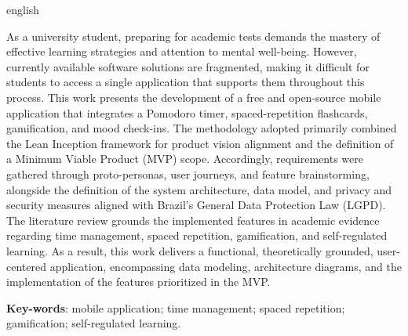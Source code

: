 \begin{resumo}[Abstract]
 \begin{otherlanguage*}{english}

As a university student, preparing for academic tests demands the mastery of effective learning strategies and attention to mental well-being. However, currently available software solutions are fragmented, making it difficult for students to access a single application that supports them throughout this process. This work presents the development of a free and open-source mobile application that integrates a Pomodoro timer, spaced-repetition flashcards, gamification, and mood check-ins. The methodology adopted primarily combined the Lean Inception framework for product vision alignment and the definition of a Minimum Viable Product (MVP) scope. Accordingly, requirements were gathered through proto-personas, user journeys, and feature brainstorming, alongside the definition of the system architecture, data model, and privacy and security measures aligned with Brazil's General Data Protection Law (LGPD). The literature review grounds the implemented features in academic evidence regarding time management, spaced repetition, gamification, and self-regulated learning. As a result, this work delivers a functional, theoretically grounded, user-centered application, encompassing data modeling, architecture diagrams, and the implementation of the features prioritized in the MVP.

   \vspace{\onelineskip}

   \noindent
   \textbf{Key-words}: mobile application; time management; spaced repetition; gamification; self-regulated learning.
 \end{otherlanguage*}
\end{resumo}

